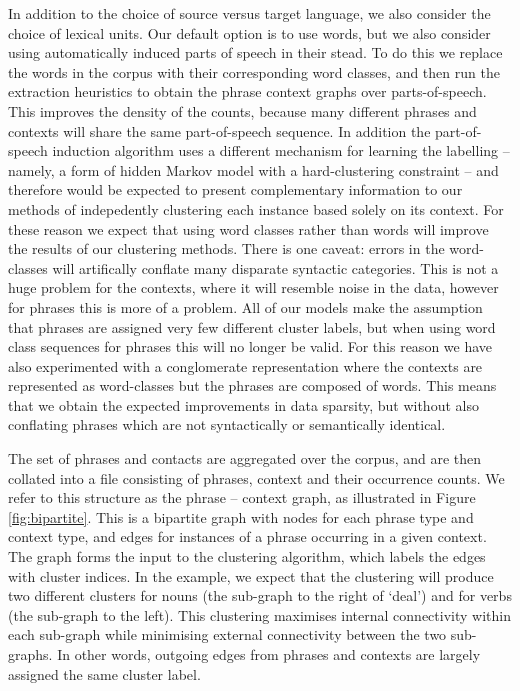 In addition to the choice of source versus target language, we also consider the choice of lexical units. Our default option is to use words, but we also consider using automatically induced parts of speech in their stead. To do this we replace the words in the corpus with their corresponding word classes, and then run the extraction heuristics to obtain the phrase context graphs over parts-of-speech. This improves the density of the counts, because many different phrases and contexts will share the same part-of-speech sequence. In addition the part-of-speech induction algorithm uses a different mechanism for learning the labelling -- namely, a form of hidden Markov model with a hard-clustering constraint -- and therefore would be expected to present complementary information to our methods of indepedently clustering each instance based solely on its context. For these reason we expect that using word classes rather than words will improve the results of our clustering methods. There is one caveat: errors in the word-classes will artifically conflate many disparate syntactic categories. This is not a huge problem for the contexts, where it will resemble noise in the data, however for phrases this is more of a problem. All of our models make the assumption that phrases are assigned very few different cluster labels, but when using word class sequences for phrases this will no longer be valid. For this reason we have also experimented with a conglomerate representation where the contexts are represented as word-classes but the phrases are composed of words. This means that we obtain the expected improvements in data sparsity, but without also conflating phrases which are not syntactically or semantically identical.

The set of phrases and contacts are aggregated over the corpus, and are then collated into a file consisting of phrases, context and their occurrence counts. We refer to this structure as the phrase -- context graph, as illustrated in Figure \ref{fig:bipartite}. This is a bipartite graph with nodes for each phrase type and context type, and edges for instances of a phrase occurring in a given context.  The graph forms the input to the clustering algorithm, which labels the edges with cluster indices.  In the example, we expect that the clustering will produce two different clusters for nouns (the sub-graph to the right of `deal') and for verbs (the sub-graph to the left). This clustering maximises internal connectivity within each sub-graph while minimising external connectivity between the two sub-graphs. In other words, outgoing edges from phrases and contexts are largely assigned the same cluster label. 

